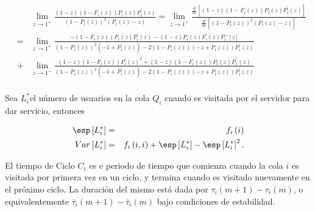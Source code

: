\begin{eqnarray*}
&&\lim_{z\rightarrow1^{+}}\frac{\left(1-z\right)\left(1-F_{i}\left(z\right)\right)P_{i}\left(z\right)P_{i}^{'}\left(z\right)}{\left(1-P_{i}\left(z\right)\right)^{2}\left(P_{i}\left(z\right)-z\right)}=\lim_{z\rightarrow1^{+}}\frac{\frac{d}{dz}\left[\left(1-z\right)\left(1-F_{i}\left(z\right)\right)P_{i}\left(z\right)P_{i}^{'}\left(z\right)\right]}{\frac{d}{dz}\left[\left(1-P_{i}\left(z\right)\right)^{2}\left(P_{i}\left(z\right)-z\right)\right]}\\
&=&\lim_{z\rightarrow1^{+}}\frac{-\left(1-F_{i}\left(z\right)\right) P_{i}\left(z\right) P_{i}^{'}\left(z\right)-(1-z) P_{i}\left(z\right) F_{i}^{'}\left(z\right)P_i'[z]}{\left(1-P_{i}\left(z\right)\right)^2 \left(-1+P_{i}^{'}\left(z\right)\right)-2 \left(1-P_{i}\left(z\right)\right) \left(-z+P_{i}\left(z\right)\right) P_{i}^{'}\left(z\right)}\\
&+&\lim_{z\rightarrow1^{+}}\frac{(1-z) \left(1-F_{i}\left(z\right)\right) P_{i}^{'}\left(z\right)^2+(1-z) \left(1-F_{i}\left(z\right)\right) P_{i}\left(z\right) P_{i}^{''}\left(z\right)}{\left(1-P_{i}\left(z\right)\right)^2 \left(-1+P_{i}^{'}\left(z\right)\right)-2 \left(1-P_{i}\left(z\right)\right) \left(-z+P_{i}\left(z\right)\right) P_{i}^{'}\left(z\right)}\\
\end{eqnarray*}


\begin{Def}
Sea $L_{i}^{*}$el n\'umero de usuarios en la cola $Q_{i}$ cuando es visitada por el servidor para dar servicio, entonces

\begin{eqnarray}
\esp\left[L_{i}^{*}\right]&=&f_{i}\left(i\right)\\
Var\left[L_{i}^{*}\right]&=&f_{i}\left(i,i\right)+\esp\left[L_{i}^{*}\right]-\esp\left[L_{i}^{*}\right]^{2}.
\end{eqnarray}

\end{Def}

\begin{Def}
El tiempo de Ciclo $C_{i}$ es e periodo de tiempo que comienza cuando la cola $i$ es visitada por primera vez en un ciclo, y termina cuando es visitado nuevamente en el pr\'oximo ciclo. La duraci\'on del mismo est\'a dada por $\tau_{i}\left(m+1\right)-\tau_{i}\left(m\right)$, o equivalentemente $\overline{\tau}_{i}\left(m+1\right)-\overline{\tau}_{i}\left(m\right)$ bajo condiciones de estabilidad.
\end{Def}

